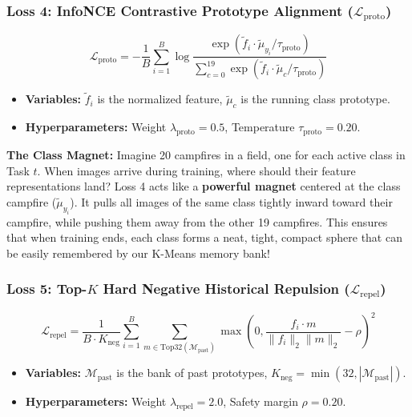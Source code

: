 \documentclass[11pt,a4paper]{article}
\begin{document}
\subsubsection{Loss 4: InfoNCE Contrastive Prototype Alignment ($\mathcal{L}_{\text{proto}}$)}
\begin{equation}
\mathcal{L}_{\text{proto}} = - \frac{1}{B} \sum_{i=1}^B \log \frac{\exp(\tilde{f}_i \cdot \tilde{\mu}_{y_i} / \tau_{\text{proto}})}{\sum_{c=0}^{19} \exp(\tilde{f}_i \cdot \tilde{\mu}_c / \tau_{\text{proto}})}
\end{equation}
\begin{itemize}[noitemsep]
    \item \textbf{Variables:} $\tilde{f}_i$ is the normalized feature, $\tilde{\mu}_c$ is the running class prototype.
    \item \textbf{Hyperparameters:} Weight $\lambda_{\text{proto}} = 0.5$, Temperature $\tau_{\text{proto}} = 0.20$.
\end{itemize}

\begin{callout}
\textbf{The Class Magnet:}\newline
Imagine 20 campfires in a field, one for each active class in Task $t$.
When images arrive during training, where should their feature representations land?\newline
Loss 4 acts like a \textbf{powerful magnet} centered at the class campfire ($\tilde{\mu}_{y_i}$). It pulls all images of the same class tightly inward toward their campfire, while pushing them away from the other 19 campfires. This ensures that when training ends, each class forms a neat, tight, compact sphere that can be easily remembered by our K-Means memory bank!
\end{callout}

\subsubsection{Loss 5: Top-$K$ Hard Negative Historical Repulsion ($\mathcal{L}_{\text{repel}}$)}
\begin{equation}
\mathcal{L}_{\text{repel}} = \frac{1}{B \cdot K_{\text{neg}}} \sum_{i=1}^B \sum_{m \in \text{Top32}(\mathcal{M}_{\text{past}})} \max\left(0, \frac{f_i \cdot m}{\|f_i\|_2 \|m\|_2} - \rho\right)^2
\end{equation}
\begin{itemize}[noitemsep]
    \item \textbf{Variables:} $\mathcal{M}_{\text{past}}$ is the bank of past prototypes, $K_{\text{neg}} = \min(32, |\mathcal{M}_{\text{past}}|)$.
    \item \textbf{Hyperparameters:} Weight $\lambda_{\text{repel}} = 2.0$, Safety margin $\rho = 0.20$.
\end{itemize}
\end{document}
